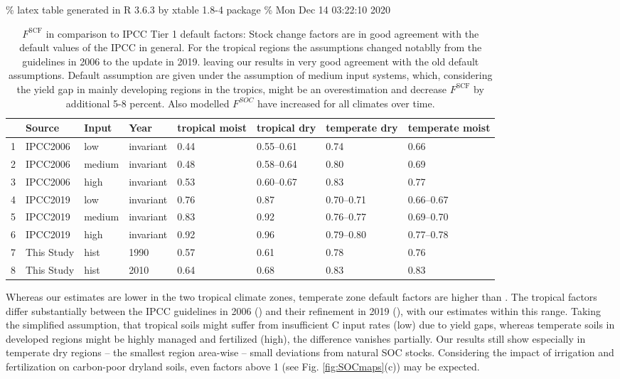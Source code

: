 \documentclass[gc, manuscript]{copernicus}
\begin{document}
\% latex table generated in R 3.6.3 by xtable 1.8-4 package
\% Mon Dec 14 03:22:10 2020

\begin{table}[ht]
\centering
\begin{tabular}{rlllllll}
  \hline
 & Source & Input & Year & tropical moist & tropical dry & temperate dry & temperate moist \\ 
  \hline
1 & IPCC2006 & low & invariant & 0.44 & 0.55--0.61 & 0.74 & 0.66 \\ 
  2 & IPCC2006 & medium & invariant & 0.48 & 0.58--0.64 & 0.80 & 0.69 \\ 
  3 & IPCC2006 & high & invariant & 0.53 & 0.60--0.67 & 0.83 & 0.77 \\ 
  4 & IPCC2019 & low & invariant & 0.76 & 0.87 & 0.70--0.71 & 0.66--0.67 \\ 
  5 & IPCC2019 & medium & invariant & 0.83 & 0.92 & 0.76--0.77 & 0.69--0.70 \\ 
  6 & IPCC2019 & high & invariant & 0.92 & 0.96 & 0.79--0.80 & 0.77--0.78 \\ 
  7 & This Study & hist & 1990 & 0.57 & 0.61 & 0.78 & 0.76 \\ 
  8 & This Study & hist & 2010 & 0.64 & 0.68 & 0.83 & 0.83 \\ 
   \hline
\end{tabular}
\caption{$F^{\mathrm{SCF}}$ in comparison to IPCC Tier 1 default factors: Stock change factors are in good agreement with the default values of the IPCC in general. For the tropical regions the assumptions changed notablly from the guidelines in 2006 to the update in 2019. leaving our results in very good agreement with the old default assumptions. Default assumption are given under the assumption of medium input systems, which, considering the yield gap in mainly developing regions in the tropics, might be an overestimation and decrease $F^{\mathrm{SCF}}$ by additional 5-8 percent. Also modelled $F^{SOC}$ have increased for all climates over time.} 
\end{table}

Whereas our estimates are lower in the two tropical climate zones, temperate zone default factors are higher than \citep{calvo_buendia_ipcc_2019}. The tropical factors differ substantially between the IPCC guidelines in 2006 (\citep{eggleston_ipcc_2006}) and their refinement in 2019 (\citep{calvo_buendia_ipcc_2019}), with our estimates within this range.
Taking the simplified assumption, that tropical soils might suffer from insufficient C input rates (low) due to yield gaps, whereas temperate soils in developed regions might be highly managed and fertilized (high), the difference vanishes partially. Our results still show especially in temperate dry regions -- the smallest region area-wise -- small deviations from natural SOC stocks. Considering the impact of irrigation and fertilization on carbon-poor dryland soils, even factors above 1 (see Fig. \ref{fig:SOCmaps}(c)) may be expected.
\end{document}
